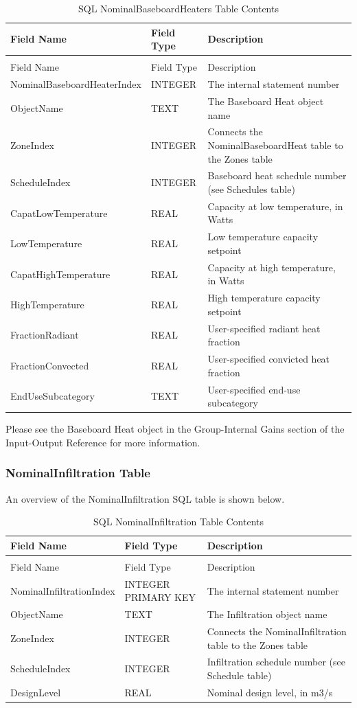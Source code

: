 \begin{longtable}[c]{>{\raggedright}p{1.5in}>{\raggedright}p{1.5in}>{\raggedright}p{2.99in}}
\caption{SQL NominalBaseboardHeaters Table Contents \label{table:table-22.-sql-nominalbaseboardheaters-table}} \tabularnewline
\toprule
Field Name & Field Type & Description \tabularnewline
\midrule
\endfirsthead

\caption[]{SQL NominalBaseboardHeaters Table Contents} \tabularnewline
\toprule
Field Name & Field Type & Description \tabularnewline
\midrule
\endhead

Nominal\-Baseboard\-Heater\-Index & INTEGER & The internal statement number \tabularnewline
ObjectName & TEXT & The Baseboard Heat object name \tabularnewline
ZoneIndex & INTEGER & Connects the NominalBaseboardHeat table to the Zones table \tabularnewline
ScheduleIndex & INTEGER & Baseboard heat schedule number (see Schedules table) \tabularnewline
Capat\-Low\-Temperature & REAL & Capacity at low temperature, in Watts \tabularnewline
LowTemperature & REAL & Low temperature capacity setpoint \tabularnewline
Capat\-High\-Temperature & REAL & Capacity at high temperature, in Watts \tabularnewline
HighTemperature & REAL & High temperature capacity setpoint \tabularnewline
FractionRadiant & REAL & User-specified radiant heat fraction \tabularnewline
FractionConvected & REAL & User-specified convicted heat fraction \tabularnewline
EndUseSubcategory & TEXT & User-specified end-use subcategory \tabularnewline
\bottomrule
\end{longtable}

Please see the Baseboard Heat object in the Group-Internal Gains section of the Input-Output Reference for more information.

\subsubsection{NominalInfiltration Table}

An overview of the NominalInfiltration SQL table is shown below.

\begin{longtable}[c]{>{\raggedright}p{1.5in}>{\raggedright}p{1.5in}>{\raggedright}p{3.0in}}
\caption{SQL NominalInfiltration Table Contents \label{table:table-23.-sql-nominalinfiltration-table}} \tabularnewline
\toprule
Field Name & Field Type & Description \tabularnewline
\midrule
\endfirsthead

\caption[]{SQL NominalInfiltration Table Contents} \tabularnewline
\toprule
Field Name & Field Type & Description \tabularnewline
\midrule
\endhead

Nominal\-Infiltration\-Index & INTEGER PRIMARY KEY & The internal statement number \tabularnewline
ObjectName & TEXT & The Infiltration object name \tabularnewline
ZoneIndex & INTEGER & Connects the NominalInfiltration table to the Zones table \tabularnewline
ScheduleIndex & INTEGER & Infiltration schedule number (see Schedule table) \tabularnewline
DesignLevel & REAL & Nominal design level, in m3/s \tabularnewline
\bottomrule
\end{longtable}

